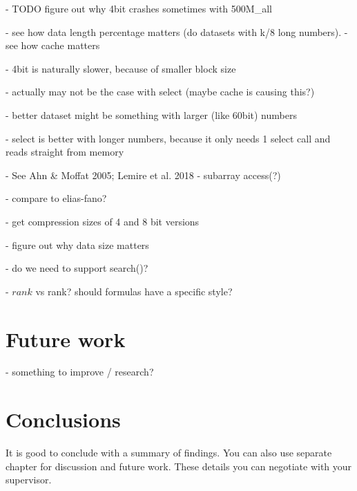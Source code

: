  - TODO figure out why 4bit crashes sometimes with 500M_all

 - see how data length percentage matters (do datasets with k/8 long numbers).
 - see how cache matters

 - 4bit is naturally slower, because of smaller block size

 - actually may not be the case with select (maybe cache is causing this?)
 
 - better dataset might be something with larger (like 60bit) numbers

 - select is better with longer numbers, because it only needs 1 select call and reads straight from memory
 
 - See Ahn \& Moffat 2005; Lemire et al. 2018
 - subarray access(?)
 
 - compare to elias-fano?

 - get compression sizes of 4 and 8 bit versions

 - figure out why data size matters

 - do we need to support search()?

 - $rank$ vs rank? should formulas have a specific style?

\chapter{Future work}
 - something to improve / research?

\chapter{Conclusions\label{chapter:conclusions}}

It is good to conclude with a summary of findings. You can also use separate chapter for discussion and future work. These details you can negotiate with your supervisor.
